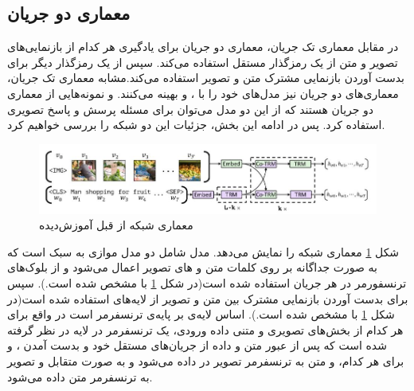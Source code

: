 \subsection[معماری دو جریان]{معماری دو جریان}
در مقابل معماری تک جریان، معماری‌ دو جریان برای یادگیری  هر کدام از بازنمایی‌های تصویر و متن از یک رمزگذار مستقل استفاده می‌کند. سپس از یک رمزگذار دیگر برای بدست آوردن بازنمایی مشترک متن و تصویر استفاده می‌کند.مشابه معماری تک جریان، معماری‌های دو جریان نیز مدل‌های خود را با
	،
	و 
	بهینه می‌کنند. 
	\cite{lu2019vilbert}
	 و
	\cite{tan2019lxmert}
  نمونه‌هایی از معماری دو جریان هستند که از این دو مدل می‌توان برای مسئله پرسش و پاسخ تصویری استفاده کرد. پس در ادامه این بخش، جزئیات این دو شبکه را بررسی خواهیم کرد.
  
	\begin{figure}
	 	\centerline{\includegraphics[scale=0.6]{images/VilBERT.JPG}}
	 	\caption[معماری شبکه از قبل آموزش‌دیده]{معماری شبکه از قبل آموزش‌دیده\cite{lu2019vilbert}}
	 	\label{fig:ViLBERT}
	\end{figure}
	
	شکل
	\ref{fig:ViLBERT}
	معماری شبکه 
	را نمایش می‌دهد. مدل 
	شامل دو مدل موازی به سبک
	است که به صورت جداگانه بر روی کلمات متن و 
	های تصویر اعمال می‌شود و از بلوک‌های ترنسفورمر در هر جریان استفاده شده است(در شکل 
	\ref{fig:ViLBERT}
	با 
	مشخص شده است.). سپس برای بدست آوردن بازنمایی مشترک بین متن و تصویر از لایه‌های 
	استفاده شده است(در شکل 
	\ref{fig:ViLBERT}
	با 
	مشخص شده است.). اساس لایه‌ی 
    بر پایه‌ی ترنسفرمر است در واقع برای هر کدام از بخش‌های تصویری و متنی داده ورودی، یک ترنسفرمر در لایه 
    در نظر گرفته شده است که پس از عبور متن و داده از جریان‌های مستقل خود و بدست آمدن 
	،
	و
	برای هر کدام، 
	و
	متن به ترنسفرمر تصویر در 
	داده می‌شود و به صورت متقابل
	و
	تصویر به ترنسفرمر متن داده می‌شود. 
	
